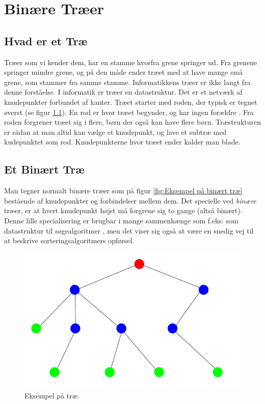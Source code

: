 \chapter{Binære Træer}
\label{ch:Binære Træer}


\section{Hvad er et Træ}
\label{sec:Hvad er et Træ}


Træer som vi kender dem, har en stamme hvorfra grene springer ud. Fra grenene springer mindre grene, og på den måde ender træet med at have mange små grene, som stammer fra samme stamme. Informatikkens træer er ikke langt fra denne forståelse. I informatik er træer en datastruktur. Det er et netværk af knudepunkter forbundet af kanter. Træet starter med roden, der typisk er tegnet øverst (se figur \ref{fig:Eksempel på træ.}). En rod er hvor træet begynder, og har ingen forældre \cite{trees}. Fra roden forgrener træet sig i flere, børn der også kan have flere børn. Træstrukturen er sådan at man altid kan vælge et knudepunkt, og lave et subtræ med kudepunktet som rod. Knudepunkterne hvor træet ender kalder man blade.

\section{Et Binært Træ}
\label{sec:Et Binært Træ}


Man tegner normalt binære træer som på figur \ref{fig:Eksempel på binært træ} bestående af knudepunkter og forbindelser mellem dem. Det specielle ved \emph{binære} træer, er at hvert knudepunkt højst må forgrene sig to gange (altså binært). Denne lille specialisering er brugbar i mange sammenhænge som f.eks. som datastruktur til søgealgoritmer \red{[kilde]}, men det viser sig også at være en snedig vej til at beskrive sorteringsalgoritmers opførsel.

\begin{figure}
	\begin{center}
		\includegraphics[scale=0.35]{../img/tree.png}
	\end{center}
	\caption{Eksempel på træ.}
	\label{fig:Eksempel på træ.}
\end{figure}



